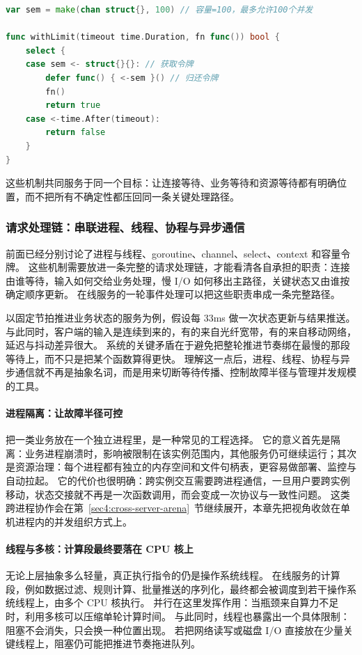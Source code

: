 \begin{tcolorbox}[title=容量令牌：把并发上限和超时写进同一条路径]
\begin{lstlisting}[style=codeblock, language=go]
var sem = make(chan struct{}, 100) // 容量=100，最多允许100个并发

func withLimit(timeout time.Duration, fn func()) bool {
    select {
    case sem <- struct{}{}: // 获取令牌
        defer func() { <-sem }() // 归还令牌
        fn()
        return true
    case <-time.After(timeout):
        return false
    }
}
\end{lstlisting}
\end{tcolorbox}

这些机制共同服务于同一个目标：让连接等待、业务等待和资源等待都有明确位置，而不把所有不确定性都压回同一条关键处理路径。

\subsubsection{请求处理链：串联进程、线程、协程与异步通信}\label{sec3:request-chain}

前面已经分别讨论了进程与线程、goroutine、channel、select、context 和容量令牌。
这些机制需要放进一条完整的请求处理链，才能看清各自承担的职责：连接由谁等待，输入如何交给业务处理，慢 I/O 如何移出主路径，关键状态又由谁按确定顺序更新。
在线服务的一轮事件处理可以把这些职责串成一条完整路径。

以固定节拍推进业务状态的服务为例，假设每 33ms 做一次状态更新与结果推送。
与此同时，客户端的输入是连续到来的，有的来自光纤宽带，有的来自移动网络，延迟与抖动差异很大。
系统的关键矛盾在于避免把整轮推进节奏绑在最慢的那段等待上，而不只是把某个函数算得更快。
理解这一点后，进程、线程、协程与异步通信就不再是抽象名词，而是用来切断等待传播、控制故障半径与管理并发规模的工具。

\paragraph{进程隔离：让故障半径可控}
把一类业务放在一个独立进程里，是一种常见的工程选择。
它的意义首先是隔离：业务进程崩溃时，影响被限制在该实例范围内，其他服务仍可继续运行；其次是资源治理：每个进程都有独立的内存空间和文件句柄表，更容易做部署、监控与自动拉起。
它的代价也很明确：跨实例交互需要跨进程通信，一旦用户要跨实例移动，状态交接就不再是一次函数调用，而会变成一次协议与一致性问题。
这类跨进程协作会在第~\ref{sec4:cross-server-arena}~节继续展开，本章先把视角收敛在单机进程内的并发组织方式上。

\paragraph{线程与多核：计算段最终要落在 CPU 核上}
无论上层抽象多么轻量，真正执行指令的仍是操作系统线程。
在线服务的计算段，例如数据过滤、规则计算、批量推送的序列化，最终都会被调度到若干操作系统线程上，由多个 CPU 核执行。
并行在这里发挥作用：当瓶颈来自算力不足时，利用多核可以压缩单轮计算时间。
与此同时，线程也暴露出一个具体限制：阻塞不会消失，只会换一种位置出现。
若把网络读写或磁盘 I/O 直接放在少量关键线程上，阻塞仍可能把推进节奏拖进队列。

